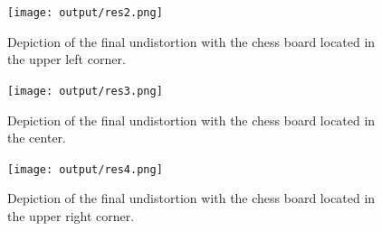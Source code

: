 \documentclass[twocolumn,10pt]{asme2ej}
\begin{document}
\begin{figure}[H]
    \onecolumn\centerline{\texttt{[image: output/res2.png]}}
    \caption{Depiction of the final undistortion with the chess board located in the upper left corner.}
    \label{fig:res2}
\end{figure}

\begin{figure}[H]
    \onecolumn\centerline{\texttt{[image: output/res3.png]}}
    \caption{Depiction of the final undistortion with the chess board located in the center.}
    \label{fig:res3}
\end{figure}

\begin{figure}[H]
    \onecolumn\centerline{\texttt{[image: output/res4.png]}}
    \caption{Depiction of the final undistortion with the chess board located in the upper right corner.}
    \label{fig:res4}
\end{figure}
\twocolumn

% 



\end{document}
